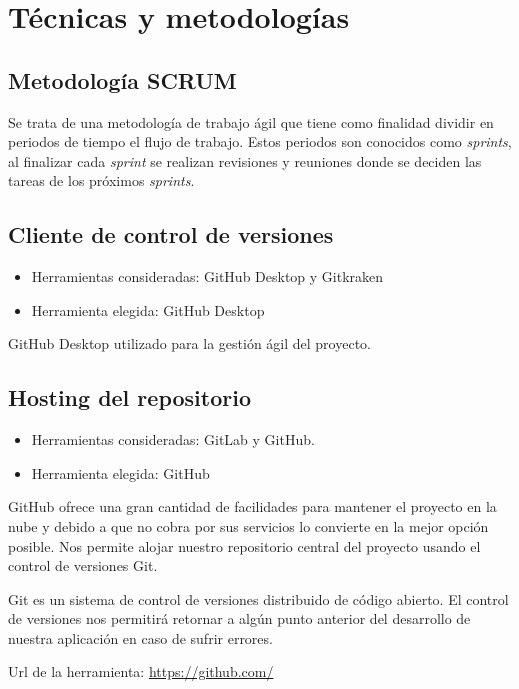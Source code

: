 
\section{Técnicas y metodologías}

\subsection{Metodología SCRUM}
Se trata de una metodología de trabajo ágil que tiene como finalidad dividir en periodos de tiempo el flujo de trabajo. Estos periodos son conocidos como  \textit{sprints}, al finalizar cada \textit{sprint} se realizan revisiones y reuniones donde se deciden las tareas de los próximos \textit{sprints}.

\subsection{Cliente de control de versiones}
\begin{itemize}
\item Herramientas consideradas: GitHub Desktop y Gitkraken
\item Herramienta elegida: GitHub Desktop
\end{itemize}

GitHub Desktop utilizado para la gestión ágil del proyecto.

\subsection{Hosting del repositorio}
\begin{itemize}
\item Herramientas consideradas: GitLab y GitHub.
\item Herramienta elegida: GitHub
\end{itemize}

GitHub ofrece una gran cantidad de facilidades para mantener el proyecto en la nube y debido a que no cobra por sus servicios lo convierte en la mejor opción posible. Nos permite alojar nuestro repositorio central del proyecto usando el control de versiones Git.

Git es un sistema de control de versiones distribuido de código abierto. El control de versiones nos permitirá retornar a algún punto anterior del desarrollo de nuestra aplicación en caso de sufrir errores.


Url de la herramienta: \url{https://github.com/}


